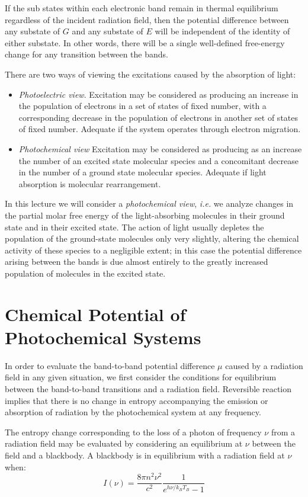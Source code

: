 \documentclass[book.tex]{subfiles}
\begin{document}
If the sub states within each electronic band remain in thermal equilibrium regardless of the incident radiation field, then the potential difference between any substate of $G$ and any substate of $E$ will be independent of the identity of either substate. In other words, there will be a single well-defined free-energy change for any transition between the bands.

There are two ways of viewing the excitations caused by the absorption of light:
\begin{itemize}
\item \textit{Photoelectric view}. Excitation may be considered as producing an increase in the population of electrons in a set of states of fixed number, with a corresponding decrease in the population of electrons in another set of states of fixed number. Adequate if the system operates through electron migration.
\item \textit{Photochemical view} Excitation may be considered as producing as an increase the number of an excited state molecular species and a concomitant decrease in the number of a ground state molecular species. Adequate if light absorption is molecular rearrangement.
\end{itemize}

In this lecture we will consider a \textit{photochemical view}, \textit{i.e.} we analyze changes in the partial molar free energy of the light-absorbing molecules in their ground state and in their excited state. The action of light usually depletes the population of the ground-state molecules only very slightly, altering the chemical activity of these species to a negligible extent; in this case the potential difference arising between the bands is due almost entirely to the greatly increased population of molecules in the excited state.

\section{Chemical Potential of Photochemical Systems}
In order to evaluate the band-to-band potential difference $\mu$ caused by a radiation field in any given situation, we first consider the conditions for equilibrium between the band-to-band transitions and a radiation field. Reversible reaction implies that there is no change in entropy accompanying the emission or absorption of radiation by the photochemical system at any frequency.

The entropy change corresponding to the loss of a photon of frequency $\nu$ from a radiation field may be evaluated by considering an equilibrium at $\nu$ between the field and a blackbody. A blackbody is in equilibrium with a radiation field at $\nu$ when:
\begin{equation}\label{Eq1}
I(\nu) = \frac{8\pi n^2\nu^2}{c^2}\frac{1}{e^{h\nu/k_BT_B}-1}
\end{equation}
\end{document}
